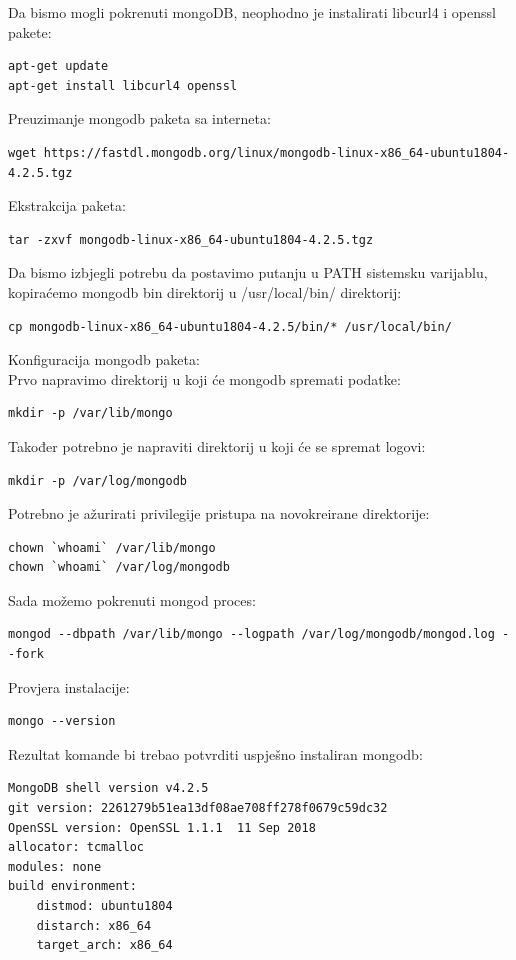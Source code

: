 \documentclass[12pt,vi]{mitthesis}
\begin{document}
\noindent
Da bismo mogli pokrenuti mongoDB, neophodno je instalirati libcurl4 i openssl pakete:
\begin{lstlisting}[style=BashInputStyle]
apt-get update
apt-get install libcurl4 openssl
\end{lstlisting}
Preuzimanje mongodb paketa sa interneta:
\begin{lstlisting}[style=BashInputStyle]
wget https://fastdl.mongodb.org/linux/mongodb-linux-x86_64-ubuntu1804-4.2.5.tgz
\end{lstlisting}
Ekstrakcija paketa:
\begin{lstlisting}[style=BashInputStyle]
tar -zxvf mongodb-linux-x86_64-ubuntu1804-4.2.5.tgz
\end{lstlisting}
Da bismo izbjegli potrebu da postavimo putanju u PATH sistemsku varijablu, kopiraćemo mongodb bin direktorij u /usr/local/bin/ direktorij:
\begin{lstlisting}[style=BashInputStyle]
cp mongodb-linux-x86_64-ubuntu1804-4.2.5/bin/* /usr/local/bin/
\end{lstlisting}
Konfiguracija mongodb paketa:\\
Prvo napravimo direktorij u koji će mongodb spremati podatke:
\begin{lstlisting}[style=BashInputStyle]
mkdir -p /var/lib/mongo
\end{lstlisting}
Također potrebno je napraviti direktorij u koji će se spremat logovi:
\begin{lstlisting}[style=BashInputStyle]
mkdir -p /var/log/mongodb
\end{lstlisting}
Potrebno je ažurirati privilegije pristupa na novokreirane direktorije:
\begin{lstlisting}[style=BashInputStyle]
chown `whoami` /var/lib/mongo 
chown `whoami` /var/log/mongodb
\end{lstlisting}
Sada možemo pokrenuti mongod proces:
\begin{lstlisting}[style=BashInputStyle]
mongod --dbpath /var/lib/mongo --logpath /var/log/mongodb/mongod.log --fork
\end{lstlisting}
Provjera instalacije:
\begin{lstlisting}[style=BashInputStyle]
mongo --version
\end{lstlisting}
Rezultat komande bi trebao potvrditi uspješno instaliran mongodb:
\begin{lstlisting}[style=BashInputStyle]
MongoDB shell version v4.2.5
git version: 2261279b51ea13df08ae708ff278f0679c59dc32
OpenSSL version: OpenSSL 1.1.1  11 Sep 2018
allocator: tcmalloc
modules: none
build environment:
    distmod: ubuntu1804
    distarch: x86_64
    target_arch: x86_64
\end{lstlisting}
\end{document}
